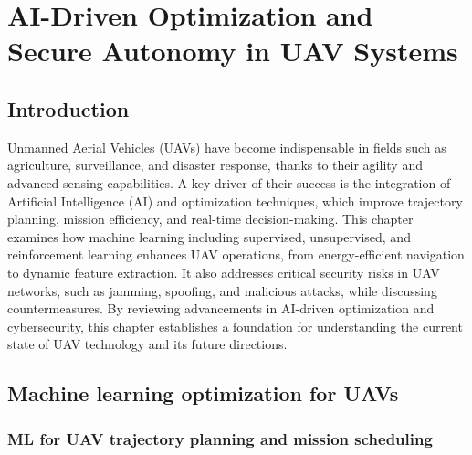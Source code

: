 
\chapter{AI-Driven Optimization and Secure Autonomy in UAV Systems}





\section{Introduction}


Unmanned Aerial Vehicles (UAVs) have become indispensable in fields such as agriculture, surveillance, and disaster response, thanks to their agility and advanced sensing capabilities. A key driver of their success is the integration of Artificial Intelligence (AI) and optimization techniques, which improve trajectory planning, mission efficiency, and real-time decision-making. This chapter examines how machine learning including supervised, unsupervised, and reinforcement learning enhances UAV operations, from energy-efficient navigation to dynamic feature extraction. It also addresses critical security risks in UAV networks, such as jamming, spoofing, and malicious attacks, while discussing countermeasures. By reviewing advancements in AI-driven optimization and cybersecurity, this chapter establishes a foundation for understanding the current state of UAV technology and its future directions.





\section{Machine learning optimization for UAVs}






\subsection{ML for UAV trajectory planning and mission scheduling}


